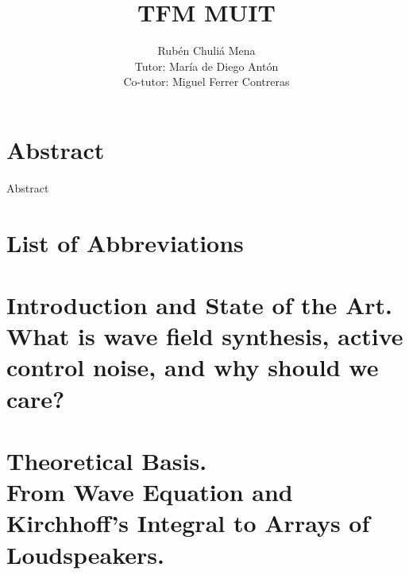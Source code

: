 \documentclass[10pt,a4paper]{report}
\providecommand\phantomsection{}
\begin{document}
\author{
	Rub\'{e}n Chuli\'{a} Mena \\
	Tutor: Mar\'ia de Diego Ant\'on \\
	Co-tutor: Miguel Ferrer Contreras
}
\title{TFM MUIT}
\date{}
\maketitle
{}

\phantomsection %
\tableofcontents

\newpage

\phantomsection
{}
\chapter*{Abstract}
Abstract

\newpage

\phantomsection
\listoffigures

\newpage

\phantomsection
{}
\chapter*{List of Abbreviations}


\newpage
\setcounter{page}{1}
\chapter[Introduction and State of the Art]{Introduction and State of the Art.\\What is wave field synthesis, active control noise, and why should we care?}


\chapter[Theoretical Basis]{Theoretical Basis.\\From Wave Equation and Kirchhoff's Integral to Arrays of Loudspeakers.}

%
%
\end{document}
